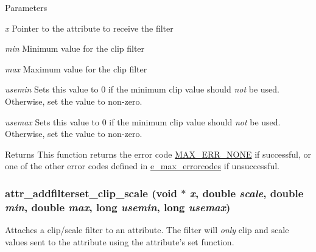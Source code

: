 \begin{DoxyParams}{Parameters}
\item[{\em x}]Pointer to the attribute to receive the filter \item[{\em min}]Minimum value for the clip filter \item[{\em max}]Maximum value for the clip filter \item[{\em usemin}]Sets this value to 0 if the minimum clip value should {\itshape not\/} be used. Otherwise, set the value to non-\/zero. \item[{\em usemax}]Sets this value to 0 if the minimum clip value should {\itshape not\/} be used. Otherwise, set the value to non-\/zero.\end{DoxyParams}
\begin{DoxyReturn}{Returns}
This function returns the error code \hyperlink{group__misc_gga0764dd6c02b76cca7d053ae50555d69da6d22f77fef8b1e1b074cef5d29d935fd}{MAX\_\-ERR\_\-NONE} if successful, or one of the other error codes defined in \hyperlink{group__misc_ga0764dd6c02b76cca7d053ae50555d69d}{e\_\-max\_\-errorcodes} if unsuccessful. 
\end{DoxyReturn}
\hypertarget{group__attr_ga1a004723683e819c24923199d820ff28}{
\subsubsection[{attr\_\-addfilterset\_\-clip\_\-scale}]{ attr\_\-addfilterset\_\-clip\_\-scale (void $\ast$ {\em x}, \/  double {\em scale}, \/  double {\em min}, \/  double {\em max}, \/  long {\em usemin}, \/  long {\em usemax})}}
\label{group__attr_ga1a004723683e819c24923199d820ff28}


Attaches a clip/scale filter to an attribute. The filter will {\itshape only\/} clip and scale values sent to the attribute using the attribute's {\ttfamily set} function.


